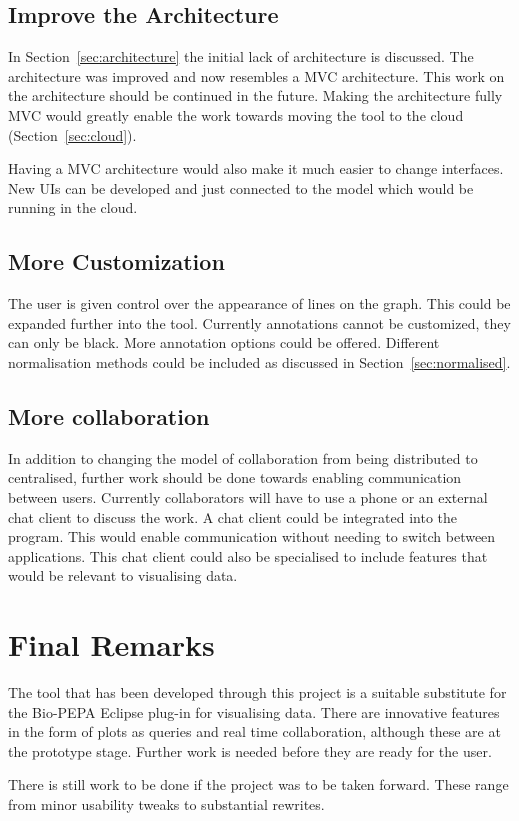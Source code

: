 \subsection{Improve the Architecture}

In Section~\ref{sec:architecture} the initial lack of architecture is discussed.  The architecture was improved and now resembles a \ac{MVC} architecture.  This work on the architecture should be continued in the future.  Making the architecture fully \ac{MVC} would greatly enable the work towards moving the tool to the cloud (Section~\ref{sec:cloud}).

Having a \ac{MVC} architecture would also make it much easier to change interfaces.  New \acp{UI} can be developed and just connected to the model which would be running in the cloud.

\subsection{More Customization}
The user is given control over the appearance of lines on the graph.  This could be expanded further into the tool.  Currently annotations cannot be customized, they can only be black.  More annotation options could be offered.  Different normalisation methods could be included as discussed in Section~\ref{sec:normalised}.

\subsection{More collaboration}
In addition to changing the model of collaboration from being distributed to centralised, further work should be done towards enabling communication between users.  Currently collaborators will have to use a phone or an external chat client to discuss the work.  A chat client could be integrated into the program.  This would enable communication without needing to switch between applications.  This chat client could also be specialised to include features that would be relevant to visualising data.

\section{Final Remarks}

The tool that has been developed through this project is a suitable substitute for the Bio-PEPA Eclipse plug-in for visualising data.  There are innovative features in the form of plots as queries and real time collaboration, although these are at the prototype stage.  Further work is needed before they are ready for the user.

There is still work to be done if the project was to be taken forward.  These range from minor usability tweaks to substantial rewrites.

